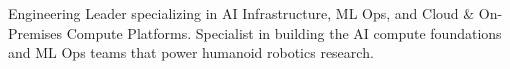 

\begin{cvparagraph}

\center
{
  Engineering Leader specializing in AI Infrastructure, ML Ops, and Cloud \& On-Premises Compute Platforms.\linebreak
  Specialist in building the AI compute foundations and ML Ops teams that power humanoid robotics research.
}
\end{cvparagraph}
